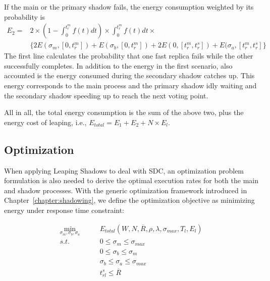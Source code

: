 If the main or the primary shadow fails, the energy consumption weighted by its probability is 
\begin{equation}
\begin{split}
E_2 = & 2 \times (1 - \int_{0}^{t_r^m} f(t)dt) \times \int_{0}^{t_r^m} f(t)dt \times 
\\  & \{2E(\sigma_m, [0, t_r^m])+E(\sigma_b, [0, t_r^m])  + 2E(0, [t_r^m, t_r^s])+E(\sigma_a, [t_r^m, t_r^s]\} 
\end{split}
\end{equation}
The first line calculates the probability that one fast replica fails while the other successfully completes. In addition to the energy in the first scenario, also accounted is the energy consumed during the secondary shadow catches up. This energy corresponds to the main process and the primary shadow idly waiting and the secondary shadow speeding up to reach the next voting point. 



All in all, the total energy consumption is the sum of the above two, plus the energy cost of leaping, i.e., $E_{total}=E_1 + E_2 + N\times E_l$. 

\subsection{Optimization}
\label{sec:silent_opt}
When applying Leaping Shadows to deal with SDC, an optimization problem formulation is also needed to derive the optimal execution rates for both the main and shadow processes. With the generic optimization framework introduced in Chapter~\ref{chapter:shadowing}, we define the optimization objective as minimizing energy under response time constraint:

\begin{equation}
\begin{alignedat}{2}
\min_{\sigma_m,\sigma_b,\sigma_a} \qquad  & E_{total} (W,N,\overline{R},\rho,\lambda,\sigma_{max}, T_l, E_l)  \\
s.t.  \qquad          & 0 \leq \sigma_m \leq \sigma_{max} \\
                      & 0 \leq \sigma_b \leq \sigma_m\\
                      & \sigma_b \leq \sigma_a \leq \sigma_{max} \\
                      & t_{rl}^s \leq \overline{R}
\end{alignedat}
\end{equation}

